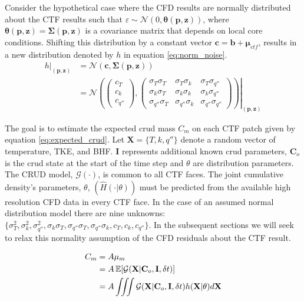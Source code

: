 Consider the hypothetical case where the CFD results are normally distributed about the CTF results such that $\varepsilon \sim \mathcal N(0, \mathbf \theta(\mathbf p, \mathbf z))$, where $\mathbf \theta(\mathbf p, \mathbf z) = \bm \Sigma(\mathbf p, \mathbf z)$ is a covariance matrix that depends on local core conditions.  Shifting this distribution by a constant vector $\bm c=\bm b + \bm \mu_{ctf}$, results in a new distribution denoted by $h$ in equation \ref{eq:norm_noise}.
\begin{align}
    \left. h \right|_{(\bm p, \bm z)} & = \mathcal N(\bm c, \bm \Sigma(\mathbf p, \bm z)) \nonumber \\
    & = \left.
        \mathcal N \left(
        \begin{pmatrix}
            c_T \\
            c_k \\
            c_{q''}
        \end{pmatrix}
    ,
        \begin{pmatrix}
            \sigma_{T} \sigma_{T} & \sigma_{T} \sigma_{k} & \sigma_{T} \sigma_{q''} \\
            \sigma_{k} \sigma_{T} & \sigma_{k} \sigma_{k} & \sigma_{k} \sigma_{q''} \\
            \sigma_{q''} \sigma_{T} & \sigma_{q''} \sigma_{k} & \sigma_{q''} \sigma_{q''}
        \end{pmatrix}
    \right)
    \right|_{(\mathbf p, \mathbf z)}
\label{eq:norm_noise}
\end{align}


The goal is to estimate the expected crud mass $C_m$ on each CTF patch given by equation \ref{eq:expected_crud}.  Let $\mathbf X= \{T, k, q''\}$ denote a random vector of temperature, TKE, and BHF. $\mathbf I$ represents additional known crud parameters, $\mathbf C_o$ is the crud state at the start of the time step and $\theta$ are distribution parameters.    The CRUD model, $\mathcal G(\cdot)$, is common to all CTF faces.  The joint cumulative density's parameters, $\theta$, $(\hat H(\cdot|\theta))$ must be predicted from the available high resolution CFD data in every CTF face.  In the case of an assumed normal distribution model there are nine unknowns:  $\{ \sigma^2_T, \sigma^2_k, \sigma^2_{q''}, \sigma_k \sigma_T, \sigma_{q''}\sigma_T, \sigma_{q''}\sigma_{k}, c_T, c_k, c_{q''} \}$.  In the subsequent sections we will seek to relax this normality assumption of the CFD residuals about the CTF result.

\begin{align}
        C_m &= A \mu_{m} \nonumber \\
        &= A \operatorname*{\mathbb{E}}[\mathcal G(\mathbf X|\mathbf C_o, \mathbf I, \delta t)] \nonumber \\
        &= A \iiint \mathcal G(\mathbf X|\mathbf C_o, \mathbf I, \delta t) h(\mathbf X|\theta) d \mathbf X
        \label{eq:expected_crud}
\end{align}


